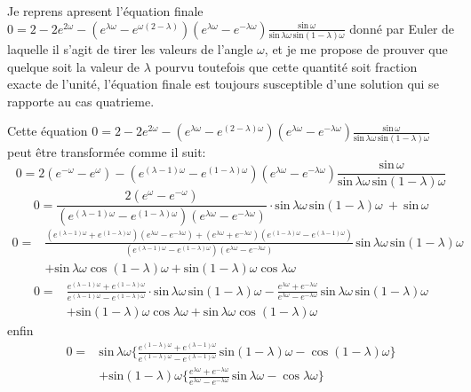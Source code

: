 \documentclass[11pt,a4paper]{article}
\begin{document}
Je reprens apresent l'équation finale
$0=2-2e^{2\omega}-(e^{\lambda\omega}-e^{\omega(2-\lambda)})(e^{\lambda\omega}-e^{-\lambda\omega})\frac{\text{sin}\,\omega}{\text{sin}\,\lambda\omega\,\text{sin}(1-\lambda)\omega}$
donné par Euler  de laquelle il s'agit de tirer les valeurs de l'angle $\omega$,
et je me propose de prouver que quelque soit la valeur de $\lambda$ pourvu toutefois
que cette quantité soit fraction exacte de l'unité, l'équation finale est toujours
susceptible d'une solution qui se rapporte au cas quatrieme.

Cette équation
$0=2-2e^{2\omega}-(e^{\lambda\omega}-e^{(2-\lambda)\omega})(e^{\lambda\omega}-e^{-\lambda\omega})\frac{\text{sin}\,\omega}{\text{sin}\,\lambda\omega\,\text{sin}(1-\lambda)\omega}$
peut être transformée comme il suit:
\[ 0=2(e^{-\omega}-e^{\omega})-(e^{(\lambda-1)\omega}-e^{(1-\lambda)\omega})(e^{\lambda\omega}-e^{-\lambda\omega})\frac{\text{sin}\,\omega}{\text{sin}\,\lambda\omega\,\text{sin}(1-\lambda)\omega} \]
\[ 0=\frac{2(e^{\omega}-e^{-\omega})}{(e^{(\lambda-1)\omega}-e^{(1-\lambda)\omega})(e^{\lambda\omega}-e^{-\lambda\omega})}\cdot \text{sin}\,\lambda\omega\,\text{sin}(1-\lambda)\omega \ +\ \text{sin}\,\omega \]
\begin{align*}
0={}& \frac{(e^{(\lambda-1)\omega}+e^{(1-\lambda)\omega})(e^{\lambda\omega}-e^{-\lambda\omega})+(e^{\lambda\omega}+e^{-\lambda\omega})(e^{(1-\lambda)\omega}-e^{(\lambda-1)\omega})}{(e^{(\lambda-1)\omega}-e^{(1-\lambda)\omega})(e^{\lambda\omega}-e^{-\lambda\omega})}\,\text{sin}\,\lambda\omega\,\text{sin}(1-\lambda)\omega \\
&+ \text{sin}\,\lambda\omega\cos(1-\lambda)\omega + \text{sin}(1-\lambda)\omega\cos\lambda\omega
\end{align*}
\begin{align*}
0={}& \frac{e^{(\lambda-1)\omega}+e^{(1-\lambda)\omega}}{e^{(\lambda-1)\omega}-e^{(1-\lambda)\omega}}\cdot\text{sin}\,\lambda\omega\,\text{sin}(1-\lambda)\omega - \frac{e^{\lambda\omega}+e^{-\lambda\omega}}{e^{\lambda\omega}-e^{-\lambda\omega}}\,\text{sin}\,\lambda\omega\,\text{sin}(1-\lambda)\omega \\
&+ \text{sin}(1-\lambda)\omega\cos\lambda\omega + \text{sin}\,\lambda\omega\cos(1-\lambda)\omega
\end{align*}
enfin
\begin{align*}
0={}& \text{sin}\,\lambda\omega\Big\{\frac{e^{(1-\lambda)\omega}+e^{(\lambda-1)\omega}}{e^{(1-\lambda)\omega}-e^{(\lambda-1)\omega}}\,\text{sin}(1-\lambda)\omega-\cos(1-\lambda)\omega\Big\} \\
&+ \text{sin}(1-\lambda)\omega\Big\{\frac{e^{\lambda\omega}+e^{-\lambda\omega}}{e^{\lambda\omega}-e^{-\lambda\omega}}\,\text{sin}\,\lambda\omega-\cos\lambda\omega\Big\}
\end{align*}
\end{document}
